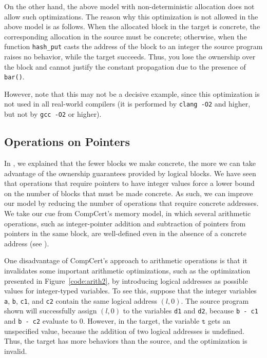On the other hand, the above model with
non-deterministic allocation does not allow such optimizations.
The reason why this optimization is not allowed in the above model is
as follows.
When the allocated block in the target is concrete, the
  corresponding allocation in the source must be concrete; otherwise,
  when the function \texttt{hash\_put} casts the address of the block to
  an integer the source program raises no behavior, while the target succeeds.
Thus, you lose the ownership over the block and cannot justify the constant propagation due to the presence of \texttt{bar()}.


   However, note that this may not be a decisive example, since this
   optimization is not used in all real-world compilers (it is
   performed by \texttt{clang -O2} and higher, but not by \texttt{gcc
     -O2} or higher).

\subsection{Operations on Pointers}

In , we explained that the fewer blocks we make concrete, the more we can take advantage of the ownership guarantees provided by logical blocks. We have seen that operations that require pointers to have integer values force a lower bound on the number of blocks that must be made concrete. As such, we can improve our model by reducing the number of operations that require concrete addresses. We take our cue from CompCert's memory model, in which several arithmetic operations, such as integer-pointer addition and subtraction of pointers from pointers in the
same block, are well-defined even in the absence of a concrete address (see ). 

One disadvantage of CompCert's approach to arithmetic operations is that it invalidates some important arithmetic optimizations, such as the optimization presented in Figure~\ref{code:arith2}, by introducing logical addresses as possible values for integer-typed variables. 
To see this, suppose that the integer variables \texttt{a}, \texttt{b}, \texttt{c1}, and \texttt{c2} contain the same logical address $(l,0)$. The source program shown will successfully assign $(l,0)$ to the variables \texttt{d1} and \texttt{d2}, because \texttt{b - c1} and \texttt{b - c2} evaluate to $0$. However, in the target, the variable $\texttt{t}$ gets an unspecified value, because the addition of two logical addresses is undefined. Thus, the target has more behaviors than the source, and the optimization is invalid.

